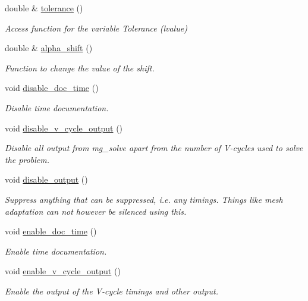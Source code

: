\begin{DoxyCompactItemize}
double \& \hyperlink{classoomph_1_1HelmholtzMGPreconditioner_ade139be8842bc33bc0ae37b64c8af65c}{tolerance} ()
\begin{DoxyCompactList}\small\item\em Access function for the variable Tolerance (lvalue) \end{DoxyCompactList}\item 
double \& \hyperlink{classoomph_1_1HelmholtzMGPreconditioner_aa9eda48c76fd82d49e7b301d337a38d2}{alpha\+\_\+shift} ()
\begin{DoxyCompactList}\small\item\em Function to change the value of the shift. \end{DoxyCompactList}\item 
void \hyperlink{classoomph_1_1HelmholtzMGPreconditioner_a52d0a5e2e0b2ac9cdbfbe639cd743eab}{disable\+\_\+doc\+\_\+time} ()
\begin{DoxyCompactList}\small\item\em Disable time documentation. \end{DoxyCompactList}\item 
void \hyperlink{classoomph_1_1HelmholtzMGPreconditioner_a2b5549471018be9d22b5ecdc95c9c113}{disable\+\_\+v\+\_\+cycle\+\_\+output} ()
\begin{DoxyCompactList}\small\item\em Disable all output from mg\+\_\+solve apart from the number of V-\/cycles used to solve the problem. \end{DoxyCompactList}\item 
void \hyperlink{classoomph_1_1HelmholtzMGPreconditioner_a313a399ae5138487c8d45efcfdc72fe3}{disable\+\_\+output} ()
\begin{DoxyCompactList}\small\item\em Suppress anything that can be suppressed, i.\+e. any timings. Things like mesh adaptation can not however be silenced using this. \end{DoxyCompactList}\item 
void \hyperlink{classoomph_1_1HelmholtzMGPreconditioner_a9a67bdd2dc6b32b89026fb5e70c4883f}{enable\+\_\+doc\+\_\+time} ()
\begin{DoxyCompactList}\small\item\em Enable time documentation. \end{DoxyCompactList}\item 
void \hyperlink{classoomph_1_1HelmholtzMGPreconditioner_a0978e7e6cfa01eb58c10b88ba4c9f2e5}{enable\+\_\+v\+\_\+cycle\+\_\+output} ()
\begin{DoxyCompactList}\small\item\em Enable the output of the V-\/cycle timings and other output. \end{DoxyCompactList}\item 

\end{DoxyCompactItemize}
